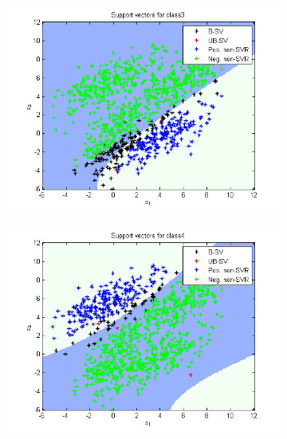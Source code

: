 \documentclass{article}
\begin{document}
\begin{figure}
\begin{subfigure}{.5\textwidth}
  \centering
  \includegraphics[width=.8\linewidth]{Classification/1c/c_poly/sv3}
 
\end{subfigure}%
\begin{subfigure}{.5\textwidth}
  \centering
  \includegraphics[width=.8\linewidth]{Classification/1c/c_poly/sv4}
  
\end{subfigure}
\end{figure}
\end{document}
